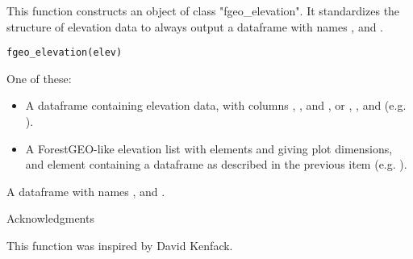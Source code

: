 \documentclass[a4paper]{book}
\begin{document}
%
\begin{Description}\relax
This function constructs an object of class "fgeo\_elevation". It standardizes
the structure of elevation data to always output a dataframe with names ,
 and .
\end{Description}
%
\begin{Usage}
\begin{verbatim}
fgeo_elevation(elev)
\end{verbatim}
\end{Usage}
%
\begin{Arguments}
\begin{ldescription}
\item[\code{elev}] One of these:
\begin{itemize}

\item A dataframe containing elevation data, with columns , , and
, or , , and  (e.g. ).
\item A ForestGEO-like elevation list with elements  and  giving
plot dimensions, and element  containing a dataframe as described in
the previous item (e.g. ).

\end{itemize}

\end{ldescription}
\end{Arguments}
%
\begin{Value}
A dataframe with names ,  and .
\end{Value}
%
\begin{Section}{Acknowledgments}

This function was inspired by David Kenfack.
\end{Section}
%
\begin{Examples}
\end{Examples}
\end{document}

